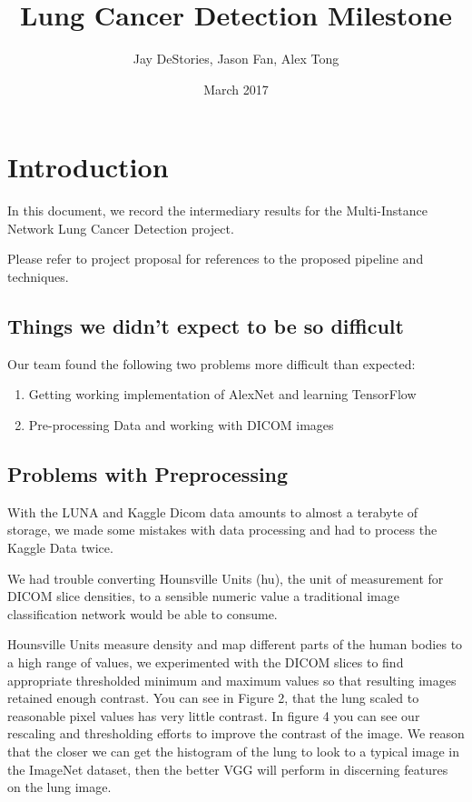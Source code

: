 \documentclass[twocolumn,10pt]{article}
\title{Lung Cancer Detection Milestone}
\author{Jay DeStories, Jason Fan, Alex Tong}
\date{March 2017}
\begin{document}
\maketitle
\section{Introduction}

In this document, we record the intermediary results for the Multi-Instance
Network Lung Cancer Detection project.

Please refer to project proposal for references to the proposed pipeline and
techniques.

\subsection{Things we didn't expect to be so difficult}

Our team found the following two problems more difficult than expected:
\begin{enumerate}[noitemsep]
  \item Getting working implementation of AlexNet \cite{AlexNet} and learning TensorFlow
  \item Pre-processing Data and working with DICOM images
\end{enumerate}

\subsection{Problems with Preprocessing}

With the LUNA and Kaggle Dicom data amounts to almost a terabyte of storage, we
made some mistakes with data processing and had to process the Kaggle Data twice.

We had trouble converting Hounsville Units (hu), the unit of measurement for DICOM
slice densities, to a sensible numeric value a traditional image classification 
network would be able to consume. 

Hounsville Units measure density and map different parts of the human bodies to
a high range of values, we experimented with the DICOM slices to find appropriate
thresholded minimum and maximum values so that resulting images retained enough
contrast. You can see in Figure 2, that the lung scaled to reasonable pixel values
has very little contrast. In figure 4 you can see our rescaling and thresholding
efforts to improve the contrast of the image. We reason that the closer we can get
the histogram of the lung to look to a typical image in the ImageNet dataset, then
the better VGG will perform in discerning features on the lung image. 
\end{document}
